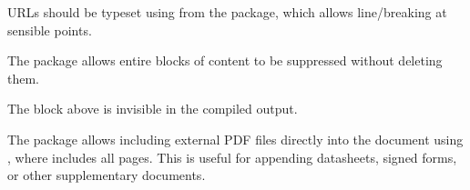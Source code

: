 URLs should be typeset using \latexinline{\url{}} from the  package, which allows line\-/breaking at sensible points.

The  package allows entire blocks of content to be suppressed without deleting them.

The block above is invisible in the compiled output.

The  package allows including external PDF files directly into the document using \latexinline{}, where  includes all pages. This is useful for appending datasheets, signed forms, or other supplementary documents.

